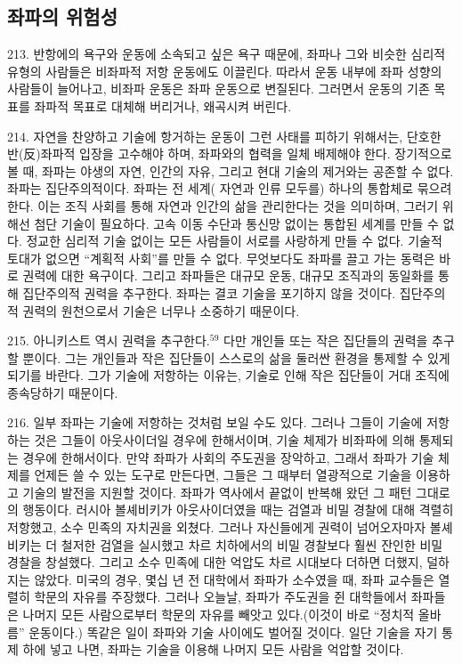 \documentclass[11pt,a4paper]{article}
\begin{document}
\begin{multicols}{2}
\section*{좌파의 위험성}


213. 반항에의 욕구와 운동에 소속되고 싶은 욕구 때문에, 좌파나 그와 비슷한 심리적 유형의 사람들은  비좌파적 저항 운동에도 이끌린다. 따라서 운동 내부에 좌파 성향의 사람들이 늘어나고, 비좌파 운동은  좌파 운동으로 변질된다. 그러면서 운동의 기존 목표를 좌파적 목표로 대체해 버리거나, 왜곡시켜 버린다. 


214. 자연을 찬양하고 기술에 항거하는 운동이 그런 사태를 피하기 위해서는, 단호한 반(反)좌파적  입장을 고수해야 하며, 좌파와의 협력을 일체 배제해야 한다. 장기적으로 볼 때, 좌파는 야생의 자연,  인간의 자유, 그리고 현대 기술의 제거와는 공존할 수 없다. 좌파는 집단주의적이다. 좌파는 전 세계( 자연과 인류 모두를) 하나의 통합체로 묶으려 한다. 이는 조직 사회를 통해 자연과 인간의 삶을  관리한다는 것을 의미하며, 그러기 위해선 첨단 기술이 필요하다. 고속 이동 수단과 통신망 없이는 통합된 세계를 만들 수 없다. 정교한 심리적 기술 없이는 모든 사람들이 서로를 사랑하게 만들 수 없다. 기술적  토대가 없으면 “계획적 사회”를 만들 수 없다. 무엇보다도 좌파를 끌고 가는 동력은 바로 권력에 대한  욕구이다. 그리고 좌파들은 대규모 운동, 대규모 조직과의 동일화를 통해 집단주의적 권력을 추구한다.  좌파는 결코 기술을 포기하지 않을 것이다. 집단주의적 권력의 원천으로서 기술은 너무나 소중하기  때문이다.  


215. 아니키스트 역시 권력을 추구한다.\hyperlink{59}{$^{59}$} 다만 개인들 또는 작은 집단들의 권력을 추구할 뿐이다. 그는  개인들과 작은 집단들이 스스로의 삶을 둘러싼 환경을 통제할 수 있게 되기를 바란다. 그가 기술에  저항하는 이유는, 기술로 인해 작은 집단들이 거대 조직에 종속당하기 때문이다.  


216. 일부 좌파는 기술에 저항하는 것처럼 보일 수도 있다. 그러나 그들이 기술에 저항하는 것은 그들이  아웃사이더일 경우에 한해서이며, 기술 체제가 비좌파에 의해 통제되는 경우에 한해서이다. 만약 좌파가  사회의 주도권을 장악하고, 그래서 좌파가 기술 체제를 언제든 쓸 수 있는 도구로 만든다면, 그들은 그  때부터 열광적으로 기술을 이용하고 기술의 발전을 지원할 것이다. 좌파가 역사에서 끝없이 반복해 왔던 그 패턴 그대로의 행동이다. 러시아 볼셰비키가 아웃사이더였을 때는 검열과 비밀 경찰에 대해 격렬히  저항했고, 소수 민족의 자치권을 외쳤다. 그러나 자신들에게 권력이 넘어오자마자 볼셰비키는 더 철저한  검열을 실시했고 차르 치하에서의 비밀 경찰보다 훨씬 잔인한 비밀 경찰을 창설했다. 그리고 소수 민족에  대한 억압도 차르 시대보다 더하면 더했지, 덜하지는 않았다. 미국의 경우, 몇십 년 전 대학에서 좌파가  소수였을 때, 좌파 교수들은 열렬히 학문의 자유를 주장했다. 그러나 오늘날, 좌파가 주도권을 쥔 대학들에서 좌파들은 나머지 모든 사람으로부터 학문의 자유를 빼앗고 있다.(이것이 바로 “정치적 올바름” 운동이다.) 똑같은 일이 좌파와 기술 사이에도 벌어질 것이다. 일단 기술을 자기 통제 하에 넣고 나면,  좌파는 기술을 이용해 나머지 모든 사람을 억압할 것이다. 



\end{multicols}
\end{document}
